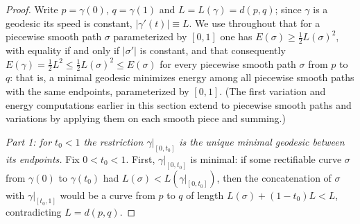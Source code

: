 \begin{proof}
\sketch
{}
Write $p=\gamma(0)$, $q=\gamma(1)$ and $L=L(\gamma)=d(p,q)$; since
$\gamma$ is a geodesic its speed is constant, $|\gamma'(t)|\equiv
L$. We use throughout that for a piecewise smooth path
$\sigma$ parameterized by $[0,1]$ one has $E(\sigma)\ge
\frac{1}{2}L(\sigma)^2$, with equality if and only if $|\sigma'|$ is
constant, and that consequently $E(\gamma)=\frac12 L^2\le
\frac12 L(\sigma)^2\le E(\sigma)$ for every piecewise smooth path
$\sigma$ from $p$ to $q$: that is, a minimal geodesic minimizes
energy among all piecewise smooth paths with the same endpoints,
parameterized by $[0,1]$. (The first variation and energy
computations earlier in this section extend to piecewise smooth
paths and variations by applying them on each smooth piece and
summing.)

\emph{Part 1: for $t_0<1$ the restriction $\gamma|_{[0,t_0]}$ is the
unique minimal geodesic between its endpoints.} Fix $0<t_0<1$.
First, $\gamma|_{[0,t_0]}$ is minimal: if some rectifiable curve
$\sigma$ from $\gamma(0)$ to $\gamma(t_0)$ had
$L(\sigma)<L(\gamma|_{[0,t_0]})$, then the concatenation of $\sigma$
with $\gamma|_{[t_0,1]}$ would be a curve from $p$ to $q$ of length
$L(\sigma)+(1-t_0)L<L$, contradicting $L=d(p,q)$.


\end{proof}
